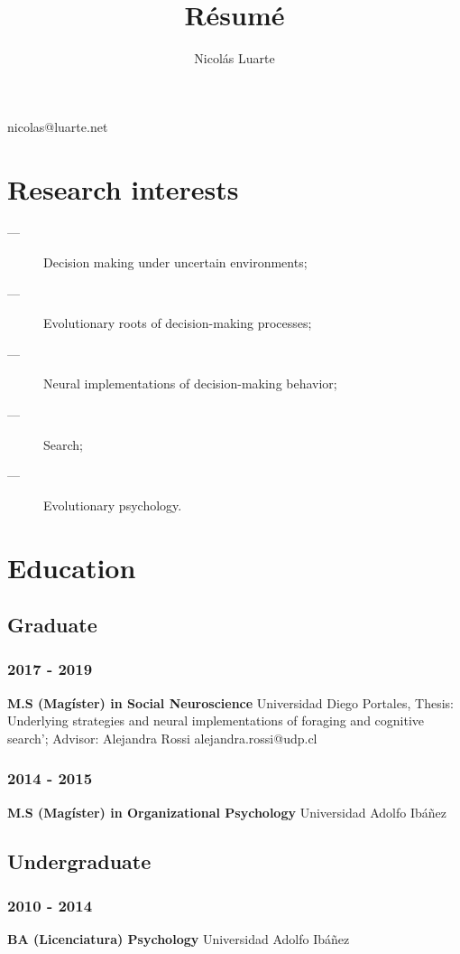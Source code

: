 \documentclass{article}
\makeatletter
\renewcommand{\maketitle}{
\begin{center}
{\huge\bfseries
\theauthor}

\vspace{.25em}

nicolas@luarte.net 

\vspace{.90em}

\end{center}
}
\makeatother
\begin{document}
\title{R\'esum\'e}
\author{Nicol\'as Luarte}


\maketitle
\section{Research interests}
\vspace{.90em}
\begin{description}
    \item[---]Decision making under uncertain environments;
    \item[---]Evolutionary roots of decision-making processes;
    \item[---]Neural implementations of decision-making behavior;
    \item[---]Search;
    \item[---]Evolutionary psychology.
\end{description}   
\section{Education}
\subsection{Graduate}\vspace{.90em}
\subsubsection{2017 -  2019}
\textbf{M.S (Mag\'ister) in Social Neuroscience} Universidad Diego Portales, Thesis: Underlying strategies and neural implementations of foraging and cognitive search'; Advisor: Alejandra Rossi alejandra.rossi@udp.cl
\subsubsection{2014 - 2015}
\textbf{M.S (Mag\'ister) in Organizational Psychology} Universidad Adolfo Ib\'a\~nez
\subsection{Undergraduate}\vspace{.90em}
\subsubsection{2010 - 2014}
\textbf{BA (Licenciatura) Psychology} Universidad Adolfo Ib\'a\~nez 
\end{document}
